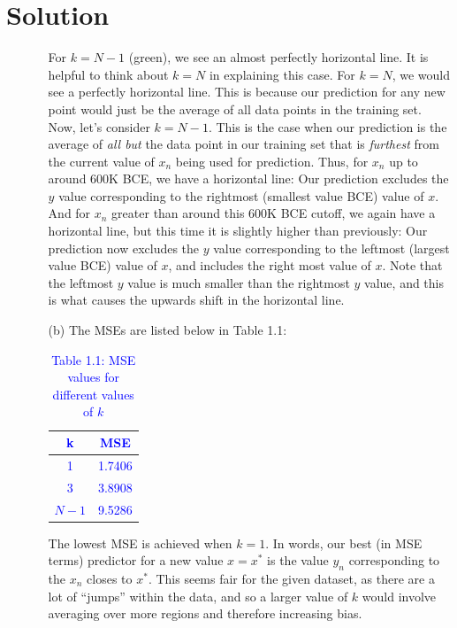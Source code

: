 \documentclass[submit]{../harvardml}
\newenvironment{solution}
  {\color{blue}\section*{Solution}}
{}
\begin{document}
\begin{solution}
\begin{enumerate}
\begin{enumerate}
        For $k=N-1$ (green), we see an almost perfectly horizontal line. It is helpful to think about $k=N$ in explaining this case. For $k=N$, we would see a perfectly horizontal line. This is because our prediction for any new point would just be the average of all data points in the training set. Now, let's consider $k=N-1$. This is the case when our prediction is the average of \textit{all but} the data point in our training set that is \textit{furthest} from the current value of $x_n$ being used for prediction. Thus, for $x_n$ up to around 600K BCE, we have a horizontal line: Our prediction excludes the $y$ value corresponding to the rightmost (smallest value BCE) value of $x$. And for $x_n$ greater than around this 600K BCE cutoff, we again have a horizontal line, but this time it is slightly higher than previously: Our prediction now excludes the $y$ value corresponding to the leftmost (largest value BCE) value of $x$, and includes the right most value of $x$. Note that the leftmost $y$ value is much smaller than the rightmost $y$ value, and this is what causes the upwards shift in the horizontal line.
        \item[(b)] The MSEs are listed below in Table 1.1:
        \begin{table}[H]
            \centering
            \renewcommand{\arraystretch}{1.3} %
            \begin{tabular}{|c|c|}
                \hline
                \textbf{\textcolor{blue}{k}} & \textbf{\textcolor{blue}{MSE}} \\
                \hline
                \textcolor{blue}{1}  & \textcolor{blue}{1.7406} \\ 
                \textcolor{blue}{3}  & \textcolor{blue}{3.8908} \\ 
                \textcolor{blue}{$N-1$} & \textcolor{blue}{9.5286} \\ 
                \hline
            \end{tabular}
            \caption*{\textcolor{blue}{Table 1.1: MSE values for different values of $k$}}
            \label{tab:mse_k}
        \end{table}
        \vspace{-0.5em}
        The lowest MSE is achieved when $k=1$. In words, our best (in MSE terms) predictor for a new value $x=x^*$ is the value $y_n$ corresponding to the $x_n$ closes to $x^*$. This seems fair for the given dataset, as there are a lot of ``jumps'' within the data, and so a larger value of $k$ would involve averaging over more regions and therefore increasing bias.

\end{enumerate}
\end{enumerate}
\end{solution}
\end{document}
